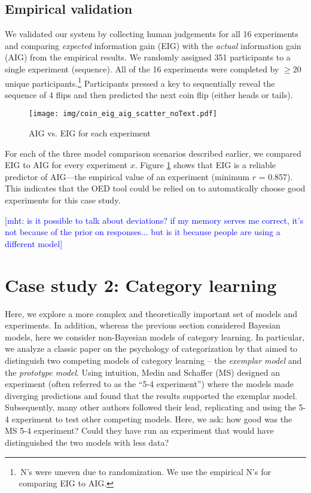 \documentclass[10pt,letterpaper]{article}
\newcommand{\mht}[1]{\textcolor{Blue}{[mht: #1]}}
\begin{document}
\subsection{Empirical validation}
We validated our system by collecting human judgements for all 16 experiments and comparing \emph{expected} information gain (EIG) with the \emph{actual} information gain (AIG) from the empirical results.
We randomly assigned 351 participants to a single experiment (sequence).
All of the 16 experiments were completed by $\geq$20 unique participants.\footnote{\,N's were uneven due to randomization. We use the empirical N's for comparing EIG to AIG.}
Participants pressed a key to sequentially reveal the sequence of 4 flips and then predicted the next coin flip (either heads or tails).

\begin{figure}[t]
 \texttt{[image: img/coin\_eig\_aig\_scatter\_noText.pdf]}
 \caption{AIG vs. EIG for each experiment}
  \label{fig:aig_vs_eig}
\end{figure}

For each of the three model comparison scenarios described earlier, we compared EIG to AIG for every experiment $x$.
Figure \ref{fig:aig_vs_eig} shows that EIG is a reliable predictor of AIG---the empirical value of an experiment (minimum $r$ = 0.857). This indicates that the OED tool could be relied on to automatically choose good experiments for this case study.

\mht{is it possible to talk about deviations? if my memory serves me correct, it's not because of the prior on responses... but is it because people are using a different model}

\section{Case study 2: Category learning}

Here, we explore a more complex and theoretically important set of models and experiments.
In addition, whereas the previous section considered Bayesian models, here we consider non-Bayesian models of category learning.
In particular, we analyze a classic paper on the psychology of categorization by \cite{medin78:pr} that aimed to distinguish two competing models of category learning -- the \emph{exemplar model} and the \emph{prototype model}.
Using intuition, Medin and Schaffer (MS) designed an experiment (often referred to as the ``5-4 experiment'') where the models made diverging predictions and found that the results supported the exemplar model.
Subsequently, many other authors followed their lead, replicating and using the 5-4 experiment to test other competing models.
Here, we ask: how good was the MS 5-4 experiment?
Could they have run an experiment that would have distinguished the two models with less data?
\end{document}

